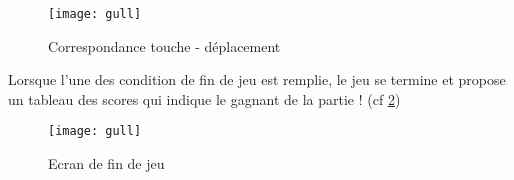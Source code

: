 		\begin{figure}[h!]
			\caption{Correspondance touche - déplacement}
			\label{fig:poskeys}
			\centering
			\texttt{[image: gull]}
		\end{figure}
		
		Lorsque l'une des condition de fin de jeu est remplie, le jeu se termine et propose un tableau des scores qui indique le gagnant de la partie ! (cf \ref{fig:finjeu})
		\begin{figure}[h!]
			\caption{Ecran de fin de jeu}
			\label{fig:finjeu}
			\centering
			\texttt{[image: gull]}
		\end{figure}

